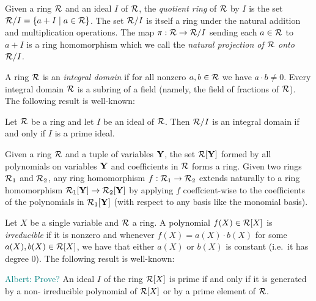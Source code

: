\documentclass[11pt,letterpaper,usenames,dvipsnames]{article}
\newcommand{\albert}[1]{\textcolor{teal}{Albert: {#1}}}
\begin{document}
Given a ring $\mathcal{R}$ and an ideal $I$ of $\mathcal{R}$, the \emph{quotient ring} of $\mathcal{R}$ by $I$ is the set  $\mathcal{R}/I =\{a+I \mid a\in \mathcal{R}\}$. The set $\mathcal{R}/I$ is itself a ring under the natural addition and multiplication operations.  The map $\pi:\mathcal{R}\to \mathcal{R}/I$ sending each $a\in \mathcal{R}$ to $a+I$ is a ring homomorphism which we call the \emph{natural projection of $\mathcal{R}$ onto $\mathcal{R}/I$.}

A ring $\mathcal{R}$ is an \emph{integral domain} if for all nonzero $a,b\in \mathcal{R}$ we have $a\cdot b\neq 0$. Every integral domain $\mathcal{R}$ is a subring of a field (namely, the field of fractions of $\mathcal{R}$). The following result is well-known:
\begin{remark}\label{r: domain_prime}
Let $\mathcal{R}$ be a ring and let $I$  be an ideal of $\mathcal{R}$. Then $\mathcal{R}/I$ is an integral domain if and only if $I$ is a prime ideal.
\end{remark}

Given a ring $\mathcal{R}$ and a tuple of variables $\mathbf{Y}$, the set $\mathcal{R}[\mathbf{Y}]$ formed by all polynomials on variables $\mathbf{Y}$ and coefficients in $\mathcal{R}$ forms a ring. Given two rings $\mathcal{R}_1$ and $\mathcal{R}_2$, any ring homomorphism $f:\mathcal{R}_1 \to \mathcal{R}_2$  extends naturally to a ring homomorphism $\mathcal{R}_1[\mathbf{Y}] \to \mathcal{R}_2[\mathbf{Y}]$ by applying $f$ coeffcient-wise to the coefficients of the polynomials in $\mathcal{R}_1[\mathbf{Y}]$ (with respect to any basis like the monomial basis). 

Let $X$ be a single variable and $\mathcal{R}$ a ring. A polynomial $f(X)\in \mathcal{R}[X]$ is \emph{irreducible} if it is nonzero and whenever $f(X)=a(X)\cdot b(X)$ for some $a(X), b(X)\in \mathcal{R}[X]$, we have that either $a(X)$ or $b(X)$ is constant (i.e.\ it has degree $0$). The following result is well-known:
\begin{remark}\label{r: prime_ideals_of_RX}
\albert{Prove?} An ideal $I$ of the ring $\mathcal{R}[X]$ is prime if and only if it is generated by a non- irreducible polynomial of $\mathcal{R}[X]$ or by a prime element of $\mathcal{R}$.
\end{remark}
\end{document}
